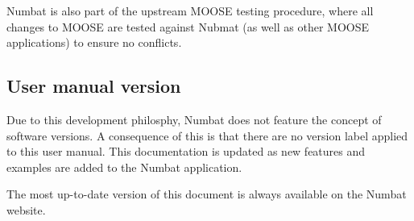 \documentclass[12pt, a4paper, midday, formal]{csiroreport2017}
\begin{document}
Numbat is also part of the upstream MOOSE testing procedure, where all changes to MOOSE are tested against
Nubmat (as well as other MOOSE applications) to ensure no conflicts.

\subsection{User manual version}

Due to this development philosphy, Numbat does not feature the concept of software versions. A consequence of this
is that there are no version label applied to this user manual. This documentation is updated as new features and
examples are added to the Numbat application.

The most up-to-date version of this document is always available on the Numbat website. 

%
%









%
%
\clearpage


\end{document}
